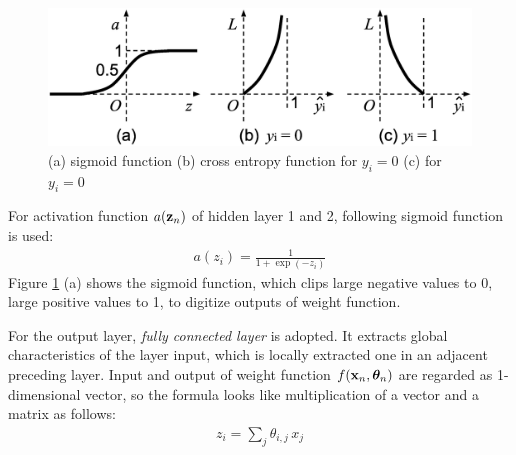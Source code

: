 \documentclass[twocolumn]{article}
\begin{document}
\begin{figure}[!tb]
 \begin{center}
  \begin{minipage}{\hsize}
   \includegraphics[width=\hsize]{fig/curves_03.eps}
   \caption{(a) sigmoid function
    (b) cross entropy function for $y_i = 0$ (c) for $y_i = 0$}
   \label{fig:curves}
  \end{minipage}
 \end{center}
\end{figure}

For activation function $a({\bf z}_n)$ of hidden layer 1 and 2,
following sigmoid function is used:
\begin{eqnarray}
a(z_i) = \frac{1}{1+\exp(-z_i)}
\end{eqnarray}
Figure \ref{fig:curves} (a) shows the sigmoid function,
which clips large negative values to 0, large positive values to 1,
to digitize outputs of weight function.

For the output layer, {\it fully connected layer} is adopted.
It extracts global characteristics of the layer input,
which is locally extracted one in an adjacent preceding layer.
Input and output of weight function 
$f({\bf x}_n, {\bm \theta}_n)$
are regarded as 1-dimensional vector,
so the formula looks like multiplication of a vector and a matrix as follows:
\begin{eqnarray}
z_i = \sum_{j} \theta_{i,j}\, x_{j}
\end{eqnarray}
\end{document}
